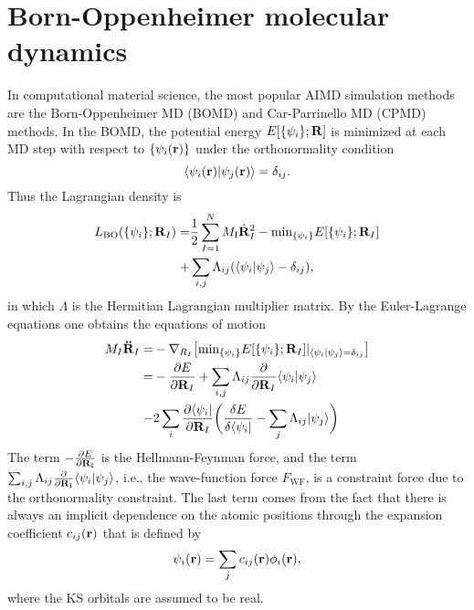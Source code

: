 \section{Born-Oppenheimer molecular dynamics}\label{section_BOMD}
In computational material science, the most popular AIMD simulation methods are the Born-Oppenheimer MD (BOMD) and Car-Parrinello MD (CPMD) methods. 
In the BOMD, the potential energy $E[\{\psi_i\};\bf{R}]$ is minimized at each MD step with respect to $\{\psi_i({\bf r})\}$  under the orthonormality condition
\begin{equation}
\langle\psi_i({\bf{r}})|\psi_j({\bf r})\rangle=\delta_{ij}.
\label{eq:e_XC}
\end{equation}
Thus the Lagrangian density is 
\begin{align}
L_\text{BO} (\{\psi_i\}; {\bf R}_{I})=&\frac{1}{2}\sum^N_{I=1}M_{\text{I}}\dot{\bf R}^2_{I} - {\text{min}}_{\{\psi_i\}}E[\{\psi_i\};{\bf R}_{I}] \nonumber \\
             +& \sum_{i,j}\Lambda_{ij}(\langle\psi_i|\psi_j\rangle-\delta_{ij} ),
\label{eq:L_BO}
\end{align}
in which $\Lambda$ is the Hermitian Lagrangian multiplier matrix. By the Euler-Lagrange equations one obtains the equations of motion
\begin{align}
     M_{I}{\bf \ddot{R}}_I =& -\nabla_{R_I} \bigl[ {\text{min}}_{\{\psi_i\}}E[\{\psi_i\};{\bf R}_I] |_{\langle\psi_i|\psi_j\rangle=\delta_{ij} }\bigr]\nonumber \\
     =&-\frac{\partial E}{\partial {\bf R}_{I}}  + \sum_{i,j}\Lambda_{ij}\frac{\partial}{\partial {\bf R}_I}\langle\psi_i|\psi_j\rangle \nonumber \\
     -&2\sum_i \frac{\partial \langle\psi_i|}{\partial {\bf R}_I}\biggl(\frac{\delta E}{\delta\langle\psi_i|}-\sum_j \Lambda_{ij}|\psi_j\rangle\biggr) 
\label{eq:LEE_BO}
\end{align}
The term $-\frac{\partial E}{\partial {\bf R}_{\text{I}}}$ is the Hellmann-Feynman force, and the term $\sum_{i,j}\Lambda_{ij}\frac{\partial}{\partial {\bf R}_{\text{I}}}\langle\psi_i|\psi_j\rangle$, i.e., the wave-function force $F_{\text{WF}}$\cite{Pulay69}, is a constraint force due to the orthonormality constraint. The last term comes from the fact that there is always an implicit dependence on the atomic positions through the expansion coefficient $c_{ij}({\bf r})$ that is defined by 
\begin{equation}
\psi_i({\bf r})=\sum_j c_{ij}({\bf r})\phi_i({\bf r}),
\label{eq:linear_combination}
\end{equation}
where the KS orbitals are assumed to be real.

